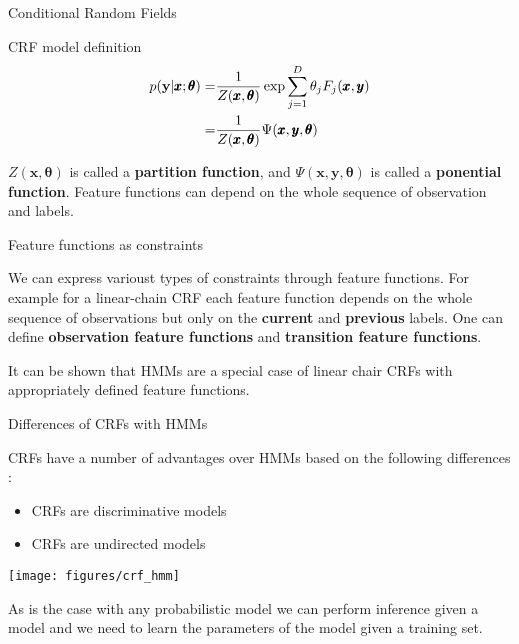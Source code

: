 \documentclass[12pt]{beamer}
\begin{document}
\begin{frame}{Conditional Random Fields}

\begin{definition}{CRF model definition}
\begin{eqnarray*} 
  p({\bf y} | {\pmb x; \pmb \theta}) =& \frac{1}{Z({\pmb x, \pmb \theta})}   
\exp  \sum_{j=1}^{D}{\theta_j F_j({\pmb x,\pmb y})} \\
=& \frac{1}{Z({\pmb x, \pmb \theta})} \Psi ({\pmb x,\pmb y, \pmb \theta}) \\
\end{eqnarray*}
\end{definition}

${Z({\pmb x, \pmb \theta})}$ is called a {\bf partition function},
and $\Psi ({\pmb x,\pmb y, \pmb \theta})$ is called a {\bf ponential function}.
Feature functions can depend on the whole sequence of observation and labels. 
\end{frame}

\begin{frame}{Feature functions as constraints}

  We can express varioust types of constraints through feature
  functions.  For example for a linear-chain CRF each feature function
  depends on the whole sequence of observations but only on the {\bf
    current} and {\bf previous} labels. One can define {\bf
    observation feature functions} and {\bf transition feature
    functions}.

  It can be shown that HMMs are a special case of linear chair CRFs
  with appropriately defined feature functions. 
\end{frame} 

\begin{frame}{Differences of CRFs with HMMs}

  CRFs have a number of advantages over HMMs based on the following differences :
\begin{itemize}
\item CRFs are discriminative models
\item CRFs are undirected models 
\end{itemize}

   \texttt{[image: figures/crf\_hmm]}

   As is the case with any probabilistic model we can perform
   inference given a model and we need to learn the parameters of the
   model given a training set.
   
\end{frame}
\end{document}
